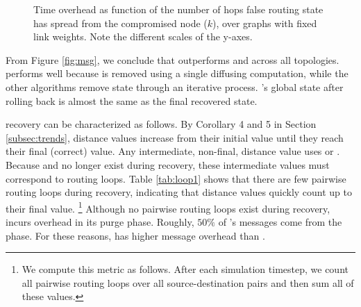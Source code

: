 \begin{figure*}[t]
\centering
{}
\caption{Time overhead as function of the number of hops false routing state has spread from the compromised node ($k$), over \er graphs with fixed link weights. 
Note the different scales of the y-axes.}
\label{fig:epoch}
\end{figure*} 




From Figure \ref{fig:msg}, we conclude that \cpr outperforms \purge and \second across all topologies. \cpr performs well because \badvector is removed using a single diffusing computation,  
while the other algorithms remove \badvector state through an iterative process.  \cprs's global state after rolling back is almost the same as the final recovered state.

\second recovery can be characterized as follows.  By Corollary 4 and 5 in Section \ref{subsec:trends}, distance values increase from their initial value until they 
reach their final (correct) value. Any intermediate, non-final, distance value uses \badvector or \oldvectors. Because \badvector and \oldvector no longer exist during recovery,
these intermediate values must correspond to routing loops.
Table \ref{tab:loop1} shows that there are few pairwise routing loops during \second recovery, indicating that \second distance values quickly count up to their final value.
{\footnote {\small We compute this metric as follows. After each simulation timestep, we count all pairwise routing loops over all source-destination pairs and then sum all of these values.}}
Although no pairwise routing loops exist during \purge recovery, \purge incurs overhead in its purge phase.  Roughly, $50\%$ of \purges's messages come from the \purge phase.
For these reasons, \purge has higher message overhead than \seconds.

